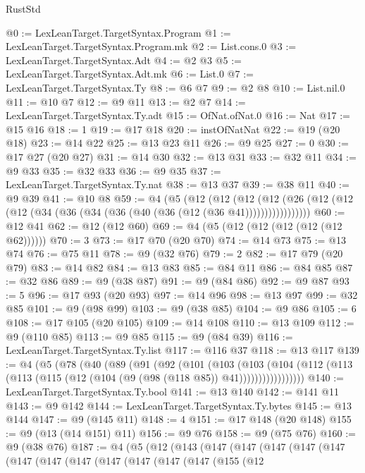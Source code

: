 \begin{lexlean}{RustStd}
\begin{coremodule}
@0 := LexLeanTarget.TargetSyntax.Program
@1 := LexLeanTarget.TargetSyntax.Program.mk
@2 := List.cons.{0}
@3 := LexLeanTarget.TargetSyntax.Adt
@4 := @2 @3
@5 := LexLeanTarget.TargetSyntax.Adt.mk
@6 := List.{0}
@7 := LexLeanTarget.TargetSyntax.Ty
@8 := @6 @7
@9 := @2 @8
@10 := List.nil.{0}
@11 := @10 @7
@12 := @9 @11
@13 := @2 @7
@14 := LexLeanTarget.TargetSyntax.Ty.adt
@15 := OfNat.ofNat.{0}
@16 := Nat
@17 := @15 @16
@18 := 1
@19 := @17 @18
@20 := instOfNatNat
@22 := @19 (@20 @18)
@23 := @14 @22
@25 := @13 @23 @11
@26 := @9 @25
@27 := 0
@30 := @17 @27 (@20 @27)
@31 := @14 @30
@32 := @13 @31
@33 := @32 @11
@34 := @9 @33
@35 := @32 @33
@36 := @9 @35
@37 := LexLeanTarget.TargetSyntax.Ty.nat
@38 := @13 @37
@39 := @38 @11
@40 := @9 @39
@41 := @10 @8
@59 := @4
    (@5
      (@12
        (@12
          (@12 (@12 (@26 (@12 (@12 (@12 (@34 (@36 (@34 (@36 (@40 (@36 (@12 (@36 @41)))))))))))))))))
@60 := @12 @41
@62 := @12 (@12 @60)
@69 := @4 (@5 (@12 (@12 (@12 (@12 (@12 @62))))))
@70 := 3
@73 := @17 @70 (@20 @70)
@74 := @14 @73
@75 := @13 @74
@76 := @75 @11
@78 := @9 (@32 @76)
@79 := 2
@82 := @17 @79 (@20 @79)
@83 := @14 @82
@84 := @13 @83
@85 := @84 @11
@86 := @84 @85
@87 := @32 @86
@89 := @9 (@38 @87)
@91 := @9 (@84 @86)
@92 := @9 @87
@93 := 5
@96 := @17 @93 (@20 @93)
@97 := @14 @96
@98 := @13 @97
@99 := @32 @85
@101 := @9 (@98 @99)
@103 := @9 (@38 @85)
@104 := @9 @86
@105 := 6
@108 := @17 @105 (@20 @105)
@109 := @14 @108
@110 := @13 @109
@112 := @9 (@110 @85)
@113 := @9 @85
@115 := @9 (@84 @39)
@116 := LexLeanTarget.TargetSyntax.Ty.list
@117 := @116 @37
@118 := @13 @117
@139 := @4
    (@5
      (@78
        (@40
          (@89
            (@91
              (@92
                (@101
                  (@103
                    (@103
                      (@104
                        (@112 (@113 (@113 (@115 (@12 (@104 (@9 (@98 (@118 @85)) @41)))))))))))))))))
@140 := LexLeanTarget.TargetSyntax.Ty.bool
@141 := @13 @140
@142 := @141 @11
@143 := @9 @142
@144 := LexLeanTarget.TargetSyntax.Ty.bytes
@145 := @13 @144
@147 := @9 (@145 @11)
@148 := 4
@151 := @17 @148 (@20 @148)
@155 := @9 (@13 (@14 @151) @11)
@156 := @9 @76
@158 := @9 (@75 @76)
@160 := @9 (@38 @76)
@187 := @4
    (@5
      (@12
        (@143
          (@147
            (@147
              (@147
                (@147
                  (@147
                    (@147
                      (@147
                        (@147
                          (@147
                            (@147
                              (@147
                                (@147
                                  (@155
                                    (@12

\end{coremodule}
\end{lexlean}
